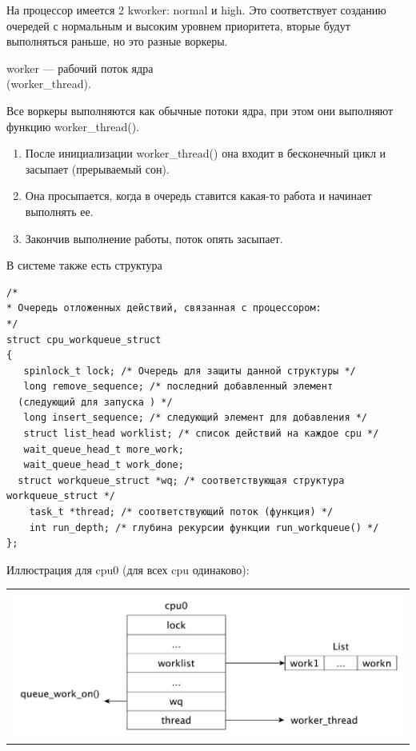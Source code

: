 На процессор имеется 2 kworker: normal и high. Это соответствует созданию очередей с нормальным и высоким уровнем приоритета, вторые будут выполняться раньше, но это разные воркеры.

worker --- рабочий поток ядра \\ (worker\_thread).

Все воркеры выполняются как обычные потоки ядра, при этом они выполняют функцию worker\_thread().
\begin{enumerate}
	\item После инициализации worker\_thread() она входит в бесконечный цикл и засыпает (прерываемый сон).
	\item Она просыпается, когда в очередь ставится какая-то работа и начинает выполнять ее.
	\item Закончив выполнение работы, поток опять засыпает.
\end{enumerate}

В системе также есть структура

\begin{lstlisting}
/*
* Очередь отложенных действий, связанная с процессором:
*/
struct cpu_workqueue_struct 
{
   spinlock_t lock; /* Очередь для защиты данной структуры */
   long remove_sequence; /* последний добавленный элемент
  (следующий для запуска ) */
   long insert_sequence; /* следующий элемент для добавления */
   struct list_head worklist; /* список действий на каждое cpu */
   wait_queue_head_t more_work;
   wait_queue_head_t work_done;
  struct workqueue_struct *wq; /* соответствующая структура
workqueue_struct */
    task_t *thread; /* соответствующий поток (функция) */
    int run_depth; /* глубина рекурсии функции run_workqueue() */
};
\end{lstlisting}

Иллюстрация для cpu0 (для всех cpu одинаково):

\begin{table}[h!]
  \centering
  \begin{tabular}{p{1\linewidth}}
    \centering
    \includegraphics[width=0.8\linewidth]{./images/cpu0.pdf}
  \end{tabular}
\end{table}

